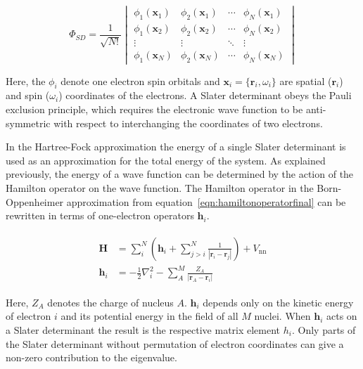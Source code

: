 \begin{equation}
     \Phi_{SD}=\frac{1}{\sqrt{N!}}
     \begin{vmatrix}
         \phi_1(\mathbf{x}_1) & \phi_2(\mathbf{x}_1) & \cdots & \phi_N(\mathbf{x}_1)\\
         \phi_1(\mathbf{x}_2) & \phi_2 (\mathbf{x}_2) & \cdots & \phi_N(\mathbf{x}_2)\\
         \vdots & \vdots & \ddots & \vdots\\
         \phi_1(\mathbf{x}_N) & \phi_2(\mathbf{x}_N) & \cdots & \phi_N(\mathbf{x}_N)
     \end{vmatrix}
     \label{eqn:SlaterDet}
\end{equation}

Here, the $\phi_i$ denote one electron spin orbitals and
$\mathbf{x}_i=\{\mathbf{r}_i,\omega_i\}$ are spatial ($\mathbf{r}_i$) and spin
($\omega_i$) coordinates of the electrons. A Slater determinant obeys the Pauli
exclusion principle, which requires the electronic wave function to be
anti-symmetric with respect to interchanging the coordinates of two electrons.

In the Hartree-Fock approximation the energy of a single Slater determinant is
used as an approximation for the total energy of the system. As explained
previously, the energy of a wave function can be determined by the action of
the Hamilton operator on the wave function. The Hamilton operator in the
Born-Oppenheimer approximation from equation~\eqref{eqn:hamiltonoperatorfinal}
can be rewritten in terms of one-electron operators $\mathbf{h}_i$.

\begin{align}
\begin{aligned}
    \mathbf{H}&=\sum_i^N\left(\mathbf{h}_i + \sum_{j>i}^N\frac{1}{|\mathbf{r}_i-\mathbf{r}_j|}\right) + V_\text{nn} \\
    \mathbf{h}_i&=-\frac{1}{2}\nabla_i^2-\sum_A^M\frac{Z_A}{|\mathbf{r}_A-\mathbf{r}_i|}\label{eqn:hamiltonoperatorhartreefock}
\end{aligned}
\end{align}

Here, $Z_A$ denotes the charge of nucleus $A$. $\mathbf{h}_i$ depends only on
the kinetic energy of electron $i$ and its potential energy in the field of all
$M$ nuclei. When $\mathbf{h}_i$ acts on a Slater determinant the result is the
respective matrix element $h_i$. Only parts of the Slater determinant without
permutation of electron coordinates can give a non-zero contribution to the
eigenvalue.

